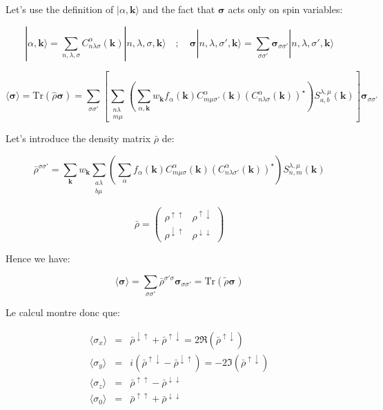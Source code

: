\documentclass{article}
\newcommand{\ket}[1]{|#1\rangle}
\newcommand{\op}[1]{\hat{#1}}
\begin{document}
\noindent
Let's use the definition of $|\alpha,\mathbf{k}\rangle$ and the fact that $\bm{\sigma}$ acts only on spin variables:

\[ \displaystyle \ket{\alpha , \mathbf{k}}= 
\sum_{n,\lambda, \sigma} C_{n \lambda \sigma}^{\alpha}(\mathbf{k}) \ket{n,\lambda, \sigma, \mathbf{k}}
\quad ; \quad 
\bm{\sigma}\ket{n,\lambda, \sigma', \mathbf{k}}=
\sum_{\sigma \sigma'} \bm{\sigma}_{\sigma \sigma'} \ket{n,\lambda, \sigma', \mathbf{k}}
\]


\[ \langle \bm{\sigma}\rangle=\text{Tr}(\op{\rho} \bm{\sigma})= 
\sum_{\sigma \sigma'} \left[ 
\sum_{\substack{n \lambda\\ m \mu}}
\left( \sum_{\alpha,\mathbf{k}} w_{\mathbf{k}} f_{\alpha}(\mathbf{k}) 
C_{m\mu \sigma'}^{\alpha}(\mathbf{k})(C_{n \lambda \sigma}^{\alpha}(\mathbf{k}))^{\star} \right)
S_{a,b}^{\lambda,\mu}(\mathbf{k}) \right] \bm{\sigma}_{\sigma \sigma'} \]



\noindent Let's introduce the density matrix $\bar{\rho}$ de:

\[ \bar{\rho}^{\sigma \sigma'}=
\sum_{\mathbf{k}}  w_{\mathbf{k}}
\sum_{\substack{a \lambda\\ b \mu}} 
\left(\sum_{\alpha}
f_{\alpha}(\mathbf{k}) 
C_{m \mu \sigma}^{\alpha}(\mathbf{k})(C_{n \lambda \sigma'}^{\alpha}(\mathbf{k}))^{\star} \right)
S_{n,m}^{\lambda,\mu}(\mathbf{k}) \]

\[ \bar{\rho}=
\left( \begin{array}{cc} \rho^{\uparrow \uparrow} & \rho^{\uparrow \downarrow} \\
\rho^{\downarrow \uparrow} & \rho^{\downarrow 
\downarrow}
\end{array} \right) \]

\noindent
Hence we have:

\[\langle \bm{\sigma}\rangle= \sum_{\sigma \sigma'} \bar{\rho}^{\sigma' \sigma} \bm{\sigma}_{\sigma \sigma'}=
\text{Tr} (\tilde{\rho}\bm{\sigma}) \]



\noindent
Le calcul montre donc que:

\[ \begin{array}{lcl} 
\langle \sigma_x \rangle&=&     \bar{\rho}^{\downarrow \uparrow} +  \bar{\rho}^{\uparrow \downarrow} = 2\Re(\bar{\rho}^{\uparrow \downarrow}) \\ 
\langle \sigma_y\rangle &=&   i(\bar{\rho}^{\uparrow \downarrow} - \bar{\rho}^{\downarrow \uparrow} )= -2\Im(\bar{\rho}^{\uparrow \downarrow}) \\ 
\langle \sigma_z \rangle&=&     \bar{\rho}^{\uparrow \uparrow}    -  \bar{\rho}^{\downarrow \downarrow} \\
\langle\sigma_0 \rangle&=&     \bar{\rho}^{\uparrow \uparrow}    +  \bar{\rho}^{\downarrow \downarrow}
\end{array}
\]
\end{document}
